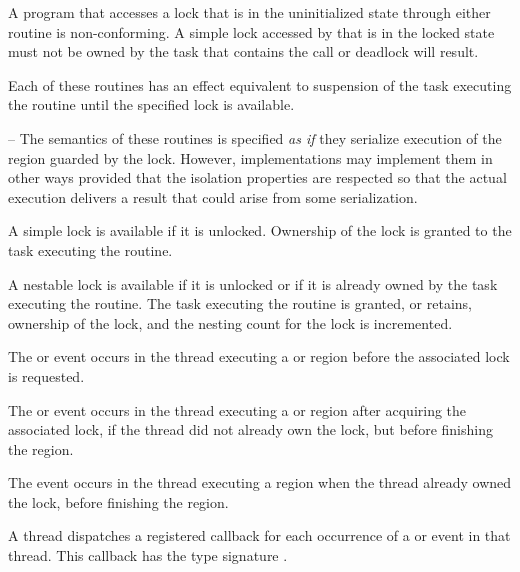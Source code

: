 \constraints
A program that accesses a lock that is in the uninitialized state through either routine is 
non-conforming. A simple lock accessed by  that is in the locked state 
must not be owned by the task that contains the call or deadlock will result.

\effect
Each of these routines has an effect equivalent to suspension of the task
executing the routine until the specified lock is available. 


\notestart \noteheader -- The semantics of these routines is specified
\emph{as if} they serialize execution of the region guarded by the
lock. However, implementations may implement them in other ways
provided that the isolation properties are respected so that the
actual execution delivers a result that could arise from some
serialization. 
\noteend

A simple lock is available if it is unlocked. Ownership of the lock is 
granted to the task executing the routine.

A nestable lock is available if it is unlocked or if it is already owned by 
the task executing the routine. The task executing the routine is granted, 
or retains, ownership of the lock, and the nesting count for the lock is 
incremented.

\events

The  or  event occurs in the thread 
executing a  or  region
before the associated lock is requested.

The  or  event occurs in the thread 
executing a  or  region
after acquiring the associated lock, if the thread did not already own the lock, 
but before finishing the region.

The  event occurs in the thread 
executing a  region
when the thread already owned the lock, 
before finishing the region.


\tools

A thread dispatches a registered 
callback for each occurrence of a  or  event 
in that thread.  This callback has the type signature .

